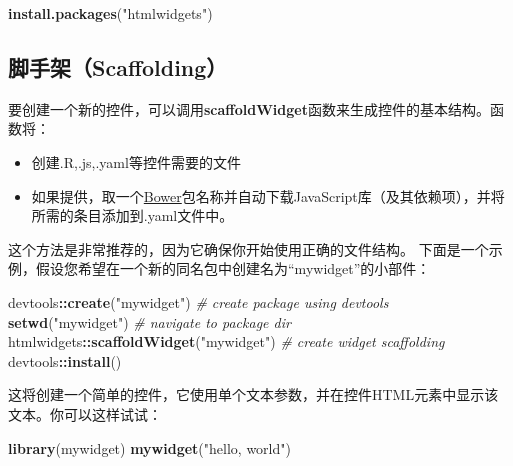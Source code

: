 \documentclass[]{book}
\newenvironment{Shaded}{\begin{snugshade}}{\end{snugshade}}
\newcommand{\KeywordTok}[1]{\textcolor[rgb]{0.13,0.29,0.53}{\textbf{#1}}}
\newcommand{\StringTok}[1]{\textcolor[rgb]{0.31,0.60,0.02}{#1}}
\newcommand{\CommentTok}[1]{\textcolor[rgb]{0.56,0.35,0.01}{\textit{#1}}}
\newcommand{\OperatorTok}[1]{\textcolor[rgb]{0.81,0.36,0.00}{\textbf{#1}}}
\newcommand{\NormalTok}[1]{#1}
\theoremstyle{definition}
\theoremstyle{definition}
\theoremstyle{definition}
\theoremstyle{remark}
\begin{document}
\begin{Shaded}
\begin{Highlighting}[]
\KeywordTok{install.packages}\NormalTok{(}\StringTok{"htmlwidgets"}\NormalTok{)}
\end{Highlighting}
\end{Shaded}

\subsection{脚手架（Scaffolding）}\label{scaffolding}

要创建一个新的控件，可以调用\textbf{scaffoldWidget}函数来生成控件的基本结构。函数将：

\begin{itemize}
\item
  创建.R,.js,.yaml等控件需要的文件
\item
  如果提供，取一个\href{https://bower.io/}{Bower}包名称并自动下载JavaScript库（及其依赖项），并将所需的条目添加到.yaml文件中。
\end{itemize}

这个方法是非常推荐的，因为它确保你开始使用正确的文件结构。
下面是一个示例，假设您希望在一个新的同名包中创建名为``mywidget''的小部件：

\begin{Shaded}
\begin{Highlighting}[]
\NormalTok{devtools}\OperatorTok{::}\KeywordTok{create}\NormalTok{(}\StringTok{"mywidget"}\NormalTok{)               }\CommentTok{# create package using devtools}
\KeywordTok{setwd}\NormalTok{(}\StringTok{"mywidget"}\NormalTok{)                          }\CommentTok{# navigate to package dir}
\NormalTok{htmlwidgets}\OperatorTok{::}\KeywordTok{scaffoldWidget}\NormalTok{(}\StringTok{"mywidget"}\NormalTok{)    }\CommentTok{# create widget scaffolding}
\NormalTok{devtools}\OperatorTok{::}\KeywordTok{install}\NormalTok{()  }
\end{Highlighting}
\end{Shaded}

这将创建一个简单的控件，它使用单个文本参数，并在控件HTML元素中显示该文本。你可以这样试试：

\begin{Shaded}
\begin{Highlighting}[]
\KeywordTok{library}\NormalTok{(mywidget)}
\KeywordTok{mywidget}\NormalTok{(}\StringTok{"hello, world"}\NormalTok{)}
\end{Highlighting}
\end{Shaded}
\end{document}
